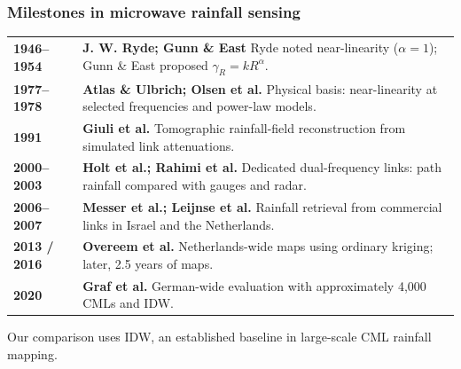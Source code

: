 \documentclass[aspectratio=169]{beamer}
\newcommand{\slidetitle}[1]{\frametitle{#1}}
\begin{document}
\begin{frame}[t]
\slidetitle{Milestones in microwave rainfall sensing}
\small
\renewcommand{\arraystretch}{1.3}
\setlength{\tabcolsep}{2pt}
\begin{tabular}{@{}p{}p{}@{}}
\textbf{1946--1954} & \textbf{J. W. Ryde; Gunn \& East}\newline
Ryde noted near-linearity ($\alpha=1$); Gunn \& East proposed $\gamma_R=kR^\alpha$.\\
\textbf{1977--1978} & \textbf{Atlas \& Ulbrich; Olsen et al.}\newline
Physical basis: near-linearity at selected frequencies and power-law models.\\
\textbf{1991} & \textbf{Giuli et al.}\newline
Tomographic rainfall-field reconstruction from simulated link attenuations.\\
\textbf{2000--2003} & \textbf{Holt et al.; Rahimi et al.}\newline
Dedicated dual-frequency links: path rainfall compared with gauges and radar.\\
\textbf{2006--2007} & \textbf{Messer et al.; Leijnse et al.}\newline
Rainfall retrieval from commercial links in Israel and the Netherlands.\\
\textbf{2013 / 2016} & \textbf{Overeem et al.}\newline
Netherlands-wide maps using ordinary kriging; later, 2.5 years of maps.\\
\textbf{2020} & \textbf{Graf et al.}\newline
German-wide evaluation with approximately 4,000 CMLs and IDW.\\
\end{tabular}
\par\vspace{0mm}
Our comparison uses IDW, an established baseline in large-scale CML rainfall mapping.

\end{frame}
\end{document}
